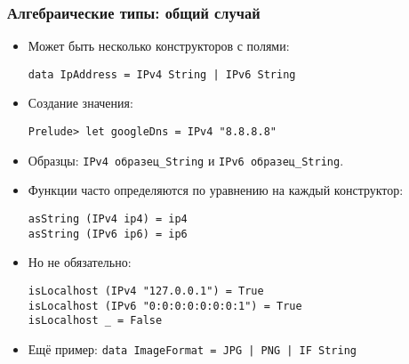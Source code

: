 \documentclass[10pt]{beamer}
\begin{document}
\begin{frame}[fragile]
\frametitle{Алгебраические типы: общий случай}
\begin{itemize}
    \item Может быть несколько конструкторов с полями:
\begin{lstlisting}[basicstyle=\ttfamily\small]
data IpAddress = IPv4 String | IPv6 String
\end{lstlisting}
\item Создание значения:
\begin{lstlisting}[basicstyle=\ttfamily\small]
Prelude> let googleDns = IPv4 "8.8.8.8"
\end{lstlisting}
\item Образцы: \lstinline[basicstyle=\ttfamily\small]|IPv4 образец_String| и \lstinline[basicstyle=\ttfamily\small]|IPv6 образец_String|.
\item Функции часто определяются по уравнению на каждый конструктор:
\begin{lstlisting}[basicstyle=\ttfamily\small]
asString (IPv4 ip4) = ip4
asString (IPv6 ip6) = ip6
\end{lstlisting}
\pause
\item Но не обязательно:
\begin{lstlisting}[basicstyle=\ttfamily\small]
isLocalhost (IPv4 "127.0.0.1") = True
isLocalhost (IPv6 "0:0:0:0:0:0:0:1") = True
isLocalhost _ = False
\end{lstlisting}
\pause
\item Ещё пример: \lstinline[basicstyle=\ttfamily\small]!data ImageFormat = JPG | PNG | IF String!
\end{itemize}
\end{frame}
\end{document}
